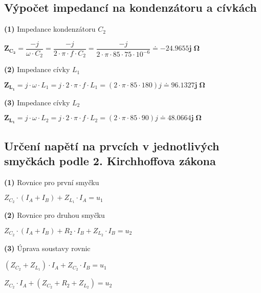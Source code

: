 \documentclass[a4paper,12pt]{article}
\begin{document}
\subsection{Výpočet impedancí na kondenzátoru a cívkách}\par
\hspace{1em}\textbf{(1)} Impedance kondenzátoru $C_2$\par
$\mathbf{Z_{C_2}}=\dfrac{-j}{\omega\cdot C_2}=\dfrac{-j}{2\cdot \pi\cdot f\cdot C_2}=\dfrac{-j}{2\cdot \pi\cdot 85\cdot 75\cdot 10^{-6}}\doteq \mathbf{-24.9655j\;\si{\Omega}}$\par\vspace{1em}
\hspace{1em}\textbf{(2)} Impedance cívky $L_1$\par
$\mathbf{Z_{L_1}}=j\cdot\omega\cdot L_1=j\cdot2\cdot\pi\cdot f\cdot L_1=(2\cdot\pi\cdot 85\cdot 180) j\doteq \mathbf{96.1327j\;\si{\Omega}}$\par\vspace{1em}
\hspace{1em}\textbf{(3)} Impedance cívky $L_2$\par
$\mathbf{Z_{L_1}}=j\cdot\omega\cdot L_2=j\cdot2\cdot\pi\cdot f\cdot L_2=(2\cdot\pi\cdot 85\cdot 90)j\doteq \mathbf{48.0664j\;\si{\Omega}}$\par
\subsection{Určení napětí na prvcích v jednotlivých smyčkách podle 2. Kirchhoffova zákona}\par
\hspace{1em}\textbf{(1)} Rovnice pro první smyčku\par
$Z_{C_2}\cdot (I_A+I_B)+Z_{L_1}\cdot I_A=u_1$\par\vspace{1em}
\hspace{1em}\textbf{(2)} Rovnice pro druhou smyčku\par
$Z_{C_2}\cdot (I_A+I_B)+R_2\cdot I_B+Z_{L_2}\cdot I_B=u_2$\par\vspace{1em}
\hspace{1em}\textbf{(3)} Úprava soustavy rovnic\par
$(Z_{C_2}+Z_{L_1})\cdot I_A + Z_{C_2}\cdot I_B=u_1$\par
$Z_{C_2}\cdot I_A + (Z_{C_2}+R_2+Z_{L_2})=u_2$\par
\end{document}
